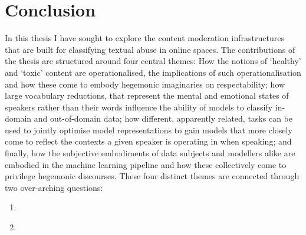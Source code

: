 \ifpdf
    \graphicspath{{Chapter8/Figs/Raster/}{Chapter8/Figs/PDF/}{Chapter8/Figs/}}
\else
    \graphicspath{{Chapter8/Figs/Vector/}{Chapter8/Figs/}}
\fi

\chapter{Conclusion}\label{chap:conclusion}

In this thesis I have sought to explore the content moderation infrastructures that are built for classifying textual abuse in online spaces.
The contributions of the thesis are structured around four central themes:
How the notions of `healthy' and `toxic' content are operationalised, the implications of such operationalisation and how these come to embody hegemonic imaginaries on respectability;
how large vocabulary reductions, that represent the mental and emotional states of speakers rather than their words influence the ability of models to classify in-domain and out-of-domain data;
how different, apparently related, tasks can be used to jointly optimise model representations to gain models that more closely come to reflect the contexts a given speaker is operating in when speaking;
and finally, how the subjective embodiments of data subjects and modellers alike are embodied in the machine learning pipeline and how these collectively come to privilege hegemonic discourses.
These four distinct themes are connected through two over-arching  questions: 
\begin{center}
\begin{minipage}{0.9\textwidth}
\vspace{5mm}
    \begin{enumerate}[start=1, label={\textbf{RQ \roman*}}]
      \item\textit{}
      \item\textit{}
    \end{enumerate}
    \vspace{5mm}
\end{minipage}
\end{center}

